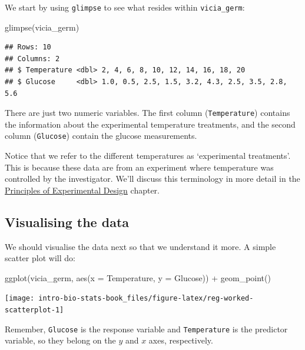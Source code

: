\documentclass[
]{book}
\newenvironment{Shaded}{\begin{snugshade}}{\end{snugshade}}
\newcommand{\AttributeTok}[1]{\textcolor[rgb]{0.77,0.63,0.00}{#1}}
\newcommand{\FunctionTok}[1]{\textcolor[rgb]{0.00,0.00,0.00}{#1}}
\newcommand{\NormalTok}[1]{#1}
\newcommand{\SpecialCharTok}[1]{\textcolor[rgb]{0.00,0.00,0.00}{#1}}
\begin{document}
We start by using \texttt{glimpse} to see what resides within \texttt{vicia\_germ}:

\begin{Shaded}
\begin{Highlighting}[]
\FunctionTok{glimpse}\NormalTok{(vicia\_germ)}
\end{Highlighting}
\end{Shaded}

\begin{verbatim}
## Rows: 10
## Columns: 2
## $ Temperature <dbl> 2, 4, 6, 8, 10, 12, 14, 16, 18, 20
## $ Glucose     <dbl> 1.0, 0.5, 2.5, 1.5, 3.2, 4.3, 2.5, 3.5, 2.8, 5.6
\end{verbatim}

There are just two numeric variables. The first column (\texttt{Temperature}) contains the information about the experimental temperature treatments, and the second column (\texttt{Glucose}) contain the glucose measurements.

Notice that we refer to the different temperatures as `experimental treatments'. This is because these data are from an experiment where temperature was controlled by the investigator. We'll discuss this terminology in more detail in the \protect\hyperlink{principles-experimental-design}{Principles of Experimental Design} chapter.

\hypertarget{visualising-the-data}{%
\subsection{Visualising the data}\label{visualising-the-data}}

We should visualise the data next so that we understand it more. A simple scatter plot will do:

\begin{Shaded}
\begin{Highlighting}[]
\FunctionTok{ggplot}\NormalTok{(vicia\_germ, }\FunctionTok{aes}\NormalTok{(}\AttributeTok{x =}\NormalTok{ Temperature, }\AttributeTok{y =}\NormalTok{ Glucose)) }\SpecialCharTok{+} 
  \FunctionTok{geom\_point}\NormalTok{()}
\end{Highlighting}
\end{Shaded}

\begin{center}\texttt{[image: intro-bio-stats-book\_files/figure-latex/reg-worked-scatterplot-1]} \end{center}

Remember, \texttt{Glucose} is the response variable and \texttt{Temperature} is the predictor variable, so they belong on the \(y\) and \(x\) axes, respectively.
\end{document}
